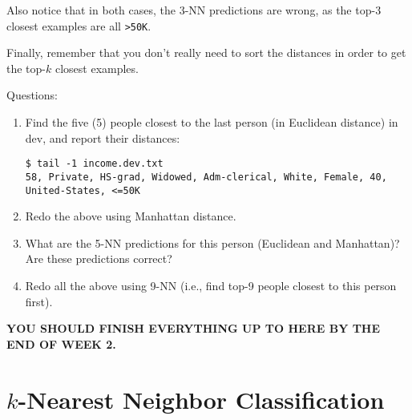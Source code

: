 \documentclass[11pt]{article}
\begin{document}
Also notice that in both cases, the 3-NN predictions are wrong,
as the top-3 closest examples are all \verb|>50K|.

Finally, remember that you don't really need to sort the distances 
in order to get the top-$k$ closest examples.

\bigskip

Questions: 

\begin{enumerate}

\item 
Find the five (5) people closest to the last person (in Euclidean distance) in dev, and report their  distances:

\begin{verbatim}
$ tail -1 income.dev.txt
58, Private, HS-grad, Widowed, Adm-clerical, White, Female, 40, United-States, <=50K
\end{verbatim}

\item Redo the above using Manhattan distance.

\item What are the 5-NN predictions for this person (Euclidean and Manhattan)? Are these predictions correct?

\item Redo all the above using 9-NN (i.e., find top-9 people closest to this person first).
\end{enumerate}

\bigskip
{\color{black}\bf YOU SHOULD FINISH EVERYTHING UP TO HERE BY THE END OF WEEK 2.}

\section{$k$-Nearest Neighbor Classification}
\end{document}
